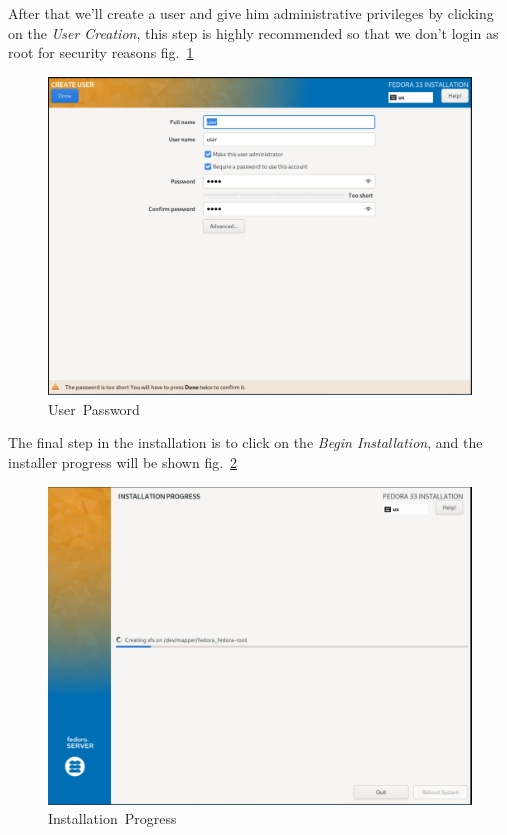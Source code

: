 \documentclass[
  14pt,
  english,
  a4paper,
]{scrreprt}
\begin{document}
After that we'll create a user and give him administrative privileges by
clicking on the \emph{User Creation}, this step is highly recommended so
that we don't login as root for security reasons
fig.~\ref{fig:feduserpass}

\begin{figure}[!htb]
\hypertarget{fig:feduserpass}{%
\centering
\includegraphics{figures/screenshots/fedora_user_pass.png}
\caption{User~Password}\label{fig:feduserpass}
}
\end{figure}

The final step in the installation is to click on the \emph{Begin
Installation}, and the installer progress will be shown
fig.~\ref{fig:fedprogress}

\begin{figure}[!htb]
\hypertarget{fig:fedprogress}{%
\centering
\includegraphics{figures/screenshots/fedora_progress.png}
\caption{Installation~Progress}\label{fig:fedprogress}
}
\end{figure}
\end{document}
